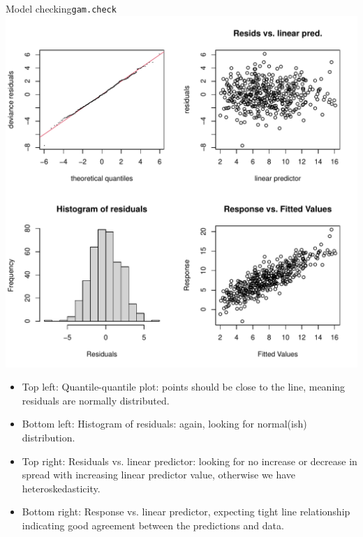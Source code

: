 
\begin{seeblock}{Model checking}{\texttt{gam.check}}
  \includegraphics[width=\textwidth]{gamcheck.pdf}
  \begin{itemize}
    \item Top left: Quantile-quantile plot: points should be close to the line, meaning residuals are normally distributed.
    \item Bottom left: Histogram of residuals: again, looking for normal(ish) distribution.
    \item Top right: Residuals vs. linear predictor: looking for no increase or decrease in spread with increasing linear predictor value, otherwise we have heteroskedasticity.
    \item Bottom right: Response vs. linear predictor, expecting tight line relationship indicating good agreement between the predictions and data.
  \end{itemize}
\end{seeblock}
